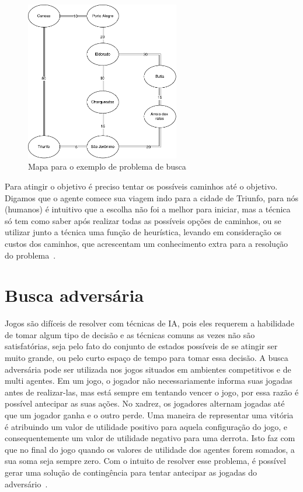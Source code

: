 \begin{figure}[ht]
	\centering
	\includegraphics[width=0.6\textwidth]{fig/mapabusca.pdf}
	\caption{Mapa para o exemplo de problema de busca}
	\label{fig:mapabusca}
\end{figure} 

Para atingir o objetivo é preciso tentar os possíveis caminhos até o objetivo. 
Digamos que o agente comece sua viagem indo para a cidade de Triunfo, para nós (humanos) é intuitivo que a escolha não foi a melhor para iniciar, mas a técnica só tem como saber após realizar todas as possíveis opções de caminhos, ou se utilizar junto a técnica uma função de heurística, levando em consideração os custos dos caminhos, que acrescentam um conhecimento extra para a resolução do problema~\cite[Capítulo 3]{intelligence2003modern}.

\section{Busca adversária}

Jogos são difíceis de resolver com técnicas de IA, pois eles requerem a habilidade de tomar algum tipo de decisão e as técnicas comuns as vezes não são satisfatórias, seja pelo fato do conjunto de estados possíveis de se atingir ser muito grande, ou pelo curto espaço de tempo para tomar essa decisão.
A busca adversária pode ser utilizada nos jogos situados em ambientes competitivos e de multi agentes.
Em um jogo, o jogador não necessariamente informa suas jogadas antes de realizar-las, mas está sempre em tentando vencer o jogo, por essa razão é possível antecipar as suas ações.
No xadrez, os jogadores alternam jogadas até que um jogador ganha e o outro perde. Uma maneira de representar uma vitória é atribuindo um valor de utilidade positivo para aquela configuração do jogo, e consequentemente um valor de utilidade negativo para uma derrota. Isto faz com que no final do jogo quando os valores de utilidade dos agentes forem somados, a sua soma seja sempre zero. 
Com o intuito de resolver esse problema, é possível gerar uma solução de contingência para tentar antecipar as jogadas do adversário~\cite[Capítulo 5]{intelligence2003modern}. 


